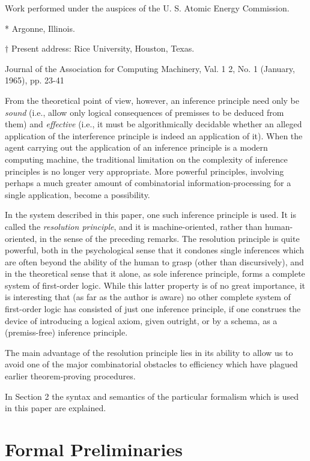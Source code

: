 \documentclass[8pt]{extarticle}
\begin{document}
Work performed under the auspices of the U. S. Atomic Energy Commission.

* Argonne, Illinois.

$\dagger$ Present address: Rice University, Houston, Texas.

\vspace{0.2in}
Journal of the Association for Computing Machinery, Val. 1 2, No. 1 (January, 1965), pp. 23-41



From the theoretical point of view, however, an inference principle need only be \emph{sound} (i.e., allow only logical consequences of premisses to be deduced from them) and \emph{effective} (i.e., it must be algorithmically decidable whether an alleged application of the interference principle is indeed an application of it). When the agent carrying out the application of an inference principle is a modern computing machine, the traditional limitation on the complexity of inference principles is no longer very appropriate. More powerful principles, involving perhaps a much greater amount of combinatorial information-processing for a single application, become a possibility.

In the system described in this paper, one such inference principle is used. It is called the \emph{resolution principle}, and it is machine-oriented, rather than human-oriented, in the sense of the preceding remarks. The resolution principle is quite powerful, both in the psychological sense that it condones single inferences which are often beyond the ability of the human to grasp (other than discursively), and in the theoretical sense that it alone, as sole inference principle, forms a complete system of first-order logic. While this latter property is of no great importance, it is interesting that (as far as the author is aware) no other complete system of first-order logic has consisted of just one inference principle, if one construes the device of introducing a logical axiom, given outright, or by a schema, as a (premiss-free) inference principle.

The main advantage of the resolution principle lies in its ability to allow us to avoid one of the major combinatorial obstacles to efficiency which have plagued earlier theorem-proving procedures.

In Section 2 the syntax and semantics of the particular formalism which is used in this paper are explained.

\section{Formal Preliminaries}
\end{document}
